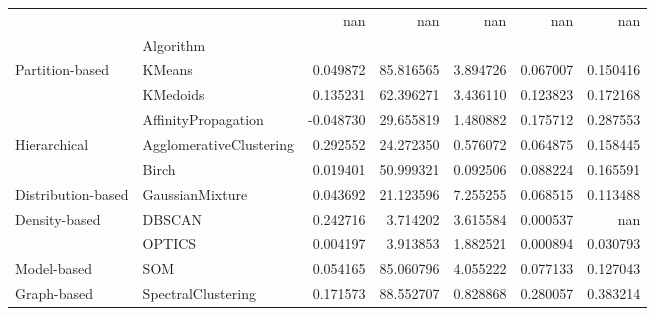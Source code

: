 \begin{tabular}{llrrrrr}
 &  & nan & nan & nan & nan & nan \\
 & Algorithm &  &  &  &  &  \\
\multirow[c]{3}{*}{Partition-based} & KMeans & 0.049872 & 85.816565 & 3.894726 & 0.067007 & 0.150416 \\
 & KMedoids & 0.135231 & 62.396271 & 3.436110 & 0.123823 & 0.172168 \\
 & AffinityPropagation & -0.048730 & 29.655819 & 1.480882 & 0.175712 & 0.287553 \\
\multirow[c]{2}{*}{Hierarchical} & AgglomerativeClustering & 0.292552 & 24.272350 & 0.576072 & 0.064875 & 0.158445 \\
 & Birch & 0.019401 & 50.999321 & 0.092506 & 0.088224 & 0.165591 \\
Distribution-based & GaussianMixture & 0.043692 & 21.123596 & 7.255255 & 0.068515 & 0.113488 \\
\multirow[c]{2}{*}{Density-based} & DBSCAN & 0.242716 & 3.714202 & 3.615584 & 0.000537 & nan \\
 & OPTICS & 0.004197 & 3.913853 & 1.882521 & 0.000894 & 0.030793 \\
Model-based & SOM & 0.054165 & 85.060796 & 4.055222 & 0.077133 & 0.127043 \\
Graph-based & SpectralClustering & 0.171573 & 88.552707 & 0.828868 & 0.280057 & 0.383214 \\
\end{tabular}
